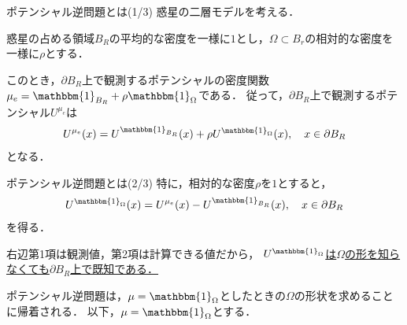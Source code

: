 \documentclass[dvipdfmx]{beamer}
\begin{document}
\begin{frame}{ポテンシャル逆問題とは(1/3)}
  惑星の二層モデルを考える．

  惑星の占める領域$B_R$の平均的な密度を一様に$1$とし，$\Omega\subset B_{r}$の相対的な密度を一様に$\rho$とする．
  \begin{figure}
    \centering
  \end{figure}


  このとき，$\partial B_R$上で観測するポテンシャルの密度関数$\mu_e=\mathbbm{1}_{B_R}+\rho\mathbbm{1}_{\Omega}$である．
  従って，$\partial B_R$上で観測するポテンシャル$U^{\mu_e}$は
  \begin{align*}
    U^{\mu_e}(x) = U^{\mathbbm{1}_{B_R}}(x) + \rho U^{\mathbbm{1}_\Omega}(x),\quad x\in\partial B_R
  \end{align*}
  となる．
\end{frame}

\begin{frame}{ポテンシャル逆問題とは(2/3)}
  特に，相対的な密度$\rho$を$1$とすると，
  \begin{align*}
    U^{\mathbbm{1}_\Omega}(x) = U^{\mu_e}(x) - U^{\mathbbm{1}_{B_R}}(x),\quad x\in\partial B_R
  \end{align*}
  を得る．

  右辺第1項は観測値，第2項は計算できる値だから，
  \underline{$U^{\mathbbm{1}_\Omega}$は$\Omega$の形を知らなくても$\partial B_R$上で既知である．}
  \begin{figure}
    \centering
  \end{figure}
  ポテンシャル逆問題は，$\mu=\mathbbm{1}_{\Omega}$としたときの$\Omega$の形状を求めることに帰着される．
  以下，$\mu=\mathbbm{1}_\Omega$とする．
\end{frame}
\end{document}
